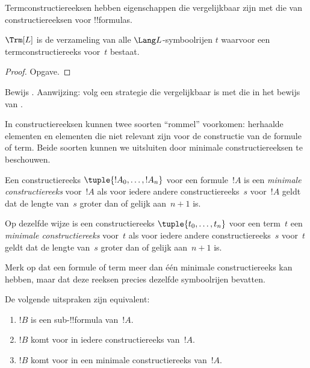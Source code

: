 \documentclass[openany]{memoir}
\begin{document}
Termconstructiereeksen hebben eigenschappen die vergelijkbaar zijn met
die van constructiereeksen voor !!{formula}s.

\begin{prop}
$\Trm[L]$ is de verzameling van alle $\Lang L$-symboolrijen $t$
waarvoor een termconstructiereeks voor~$t$ bestaat.
\end{prop}

\begin{proof}
Opgave.
\end{proof}

\begin{prob}
Bewijs .
Aanwijzing: volg een strategie die vergelijkbaar is met die in het
bewijs van .
\end{prob}

In constructiereeksen kunnen twee soorten ``rommel'' voorkomen:
herhaalde elementen en elementen die niet relevant zijn voor de
constructie van de formule of term. Beide soorten kunnen we uitsluiten
door minimale constructiereeksen te beschouwen.

\begin{defn}
Een constructiereeks $\tuple{!A_0, \ldots, !A_n}$ voor een
formule~$!A$ is een \emph{minimale constructiereeks} voor~$!A$
als voor iedere andere constructiereeks~$s$ voor~$!A$ geldt dat de
lengte van~$s$ groter dan of gelijk aan~$n+1$ is.

Op dezelfde wijze is een constructiereeks $\tuple{t_0, \ldots, t_n}$
voor een term~$t$ een \emph{minimale constructiereeks}
voor~$t$ als voor iedere andere constructiereeks~$s$ voor~$t$ geldt dat
de lengte van~$s$ groter dan of gelijk aan~$n+1$ is.
\end{defn}

Merk op dat een formule of term meer dan één minimale
constructiereeks kan hebben, maar dat deze reeksen precies dezelfde
symboolrijen bevatten.

\begin{prop}
De volgende uitspraken zijn equivalent:
\begin{enumerate}
    \item $!B$ is een sub-!!{formula} van~$!A$.
    \item $!B$ komt voor in iedere constructiereeks van~$!A$.
    \item $!B$ komt voor in een minimale constructiereeks van~$!A$.
\end{enumerate}
\end{prop}
\end{document}
